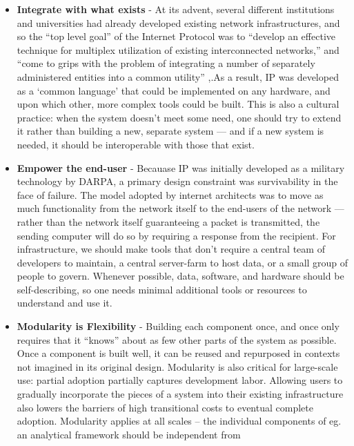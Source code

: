 \documentclass{article}
\begin{document}
\begin{itemize}

\item
  \textbf{Integrate with what exists} - At its advent, several different
  institutions and universities had already developed existing network
  infrastructures, and so the ``top level goal'' of the Internet
  Protocol was to ``develop an effective technique for multiplex
  utilization of existing interconnected networks,'' and ``come to grips
  with the problem of integrating a number of separately administered
  entities into a common utility'' \cite{clarkDesignPhilosophyDARPA1988},.As a result, IP was developed as
  a `common language' that could be implemented on any hardware, and
  upon which other, more complex tools could be built. This is also a
  cultural practice: when the system doesn't meet some need, one should
  try to extend it rather than building a new, separate system --- and
  if a new system is needed, it should be interoperable with those that
  exist.
\item
  \textbf{Empower the end-user} - Becauase IP was initially developed as
  a military technology by DARPA, a primary design constraint was
  survivability in the face of failure. The model adopted by internet
  architects was to move as much functionality from the network itself
  to the end-users of the network --- rather than the network itself
  guaranteeing a packet is transmitted, the sending computer will do so
  by requiring a response from the recipient. For infrastructure, we
  should make tools that don't require a central team of developers to
  maintain, a central server-farm to host data, or a small group of
  people to govern. Whenever possible, data, software, and hardware
  should be self-describing, so one needs minimal additional tools or
  resources to understand and use it.
\item
  \textbf{Modularity is Flexibility} - Building each component once, and
  once only requires that it ``knows'' about as few other parts of the
  system as possible. Once a component is built well, it can be reused
  and repurposed in contexts not imagined in its original design.
  Modularity is also critical for large-scale use: partial adoption
  partially captures development labor. Allowing users to gradually
  incorporate the pieces of a system into their existing infrastructure
  also lowers the barriers of high transitional costs to eventual
  complete adoption. Modularity applies at all scales -- the individual
  components of eg. an analytical framework should be independent from

\end{itemize}
\end{document}
